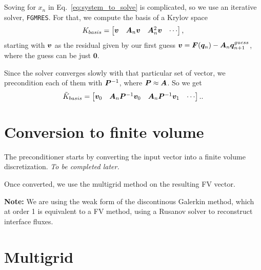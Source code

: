 \documentclass{article}
\begin{document}
\section{\fgmres}\label{sec:fgmres}

Soving for $x_n$ in Eq.~\ref{eq:system_to_solve} is complicated, so we use an iterative solver, \texttt{FGMRES}.
For that, we compute the basis of a Krylov space
$$K_{basis} = \left[\begin{matrix} \bm{v} & \bm{A}_n\bm{v} & \bm{A}_n^2 \bm{v} & \cdots \end{matrix}\right],$$
 starting with $\bm{v}$ as the residual given by our first guess
$\bm{v} = \bm{F}(\bm{q}_{n}) - \bm{A}_n \bm{q}_{n+1}^{guess}$, where the guess can be just $\bm{0}$.

Since the solver converges slowly with that particular set of vector, we precondition each of them
with $\bm{P}^{-1}$, where $\bm{P}\approx\bm{A}$.
So we get 
\begin{equation}
\tilde{K}_{basis} = \left[\begin{matrix}
    \bm{v}_0 &
    \bm{A}_n\bm{P}^{-1}\bm{v}_0 &
    \bm{A}_n\bm{P}^{-1}\bm{v}_1 & \cdots \end{matrix}\right].
    \text{.}
\end{equation}


\section{Conversion to finite volume}\label{sec:finite_volume}

The \fgmres{} preconditioner starts by converting the input vector into a finite volume discretization. \emph{To be completed later.}

Once converted, we use the multigrid method on the resulting FV vector.

\textbf{Note:} We are using the weak form of the discontinous Galerkin method,
which at order 1 is equivalent to a FV method, using a Rusanov solver to reconstruct interface fluxes.


\section{Multigrid}\label{sec:multigrid}
\end{document}

